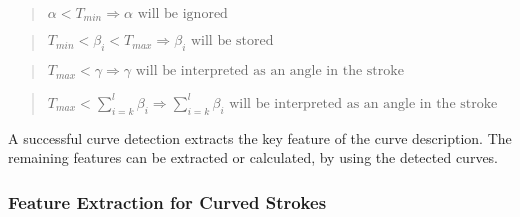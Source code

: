 \begin{quote}
\(
  \alpha < T_{min} \Rightarrow \alpha \text{ will be ignored}
\)
\end{quote}
\begin{quote}
\(
  T_{min} < \beta_{i} < T_{max} \Rightarrow \beta_{i} \text{ will be stored}
\)
\end{quote}
\begin{quote}
\(
  T_{max} < \gamma \Rightarrow 
                  \gamma \text{ will be interpreted as an angle in the stroke}
\)
\end{quote}
\begin{quote}
\(
  T_{max} < \sum\limits_{i=k}^{l} \beta_{i} \Rightarrow 
                               \sum\limits_{i=k}^{l} \beta_{i}
                               \text{ will be interpreted as an 
                               angle in the stroke}
\)
\end{quote}
A successful curve detection extracts the key feature of the curve 
description. The remaining features can be extracted or calculated,
by using the detected curves.

\subsubsection{Feature Extraction for Curved Strokes}
\label{sec:hwre:featureextractionforcurvedstrokes}


